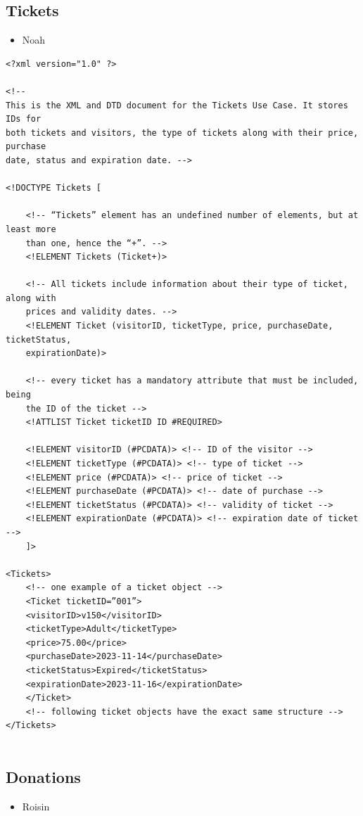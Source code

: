 \documentclass{article} %
\begin{document}
\subsection{Tickets}
\begin{itemize}
    \item Noah
\end{itemize}

\begin{verbatim}
<?xml version="1.0" ?>

<!-- 
This is the XML and DTD document for the Tickets Use Case. It stores IDs for 
both tickets and visitors, the type of tickets along with their price, purchase 
date, status and expiration date. -->

<!DOCTYPE Tickets [
    
    <!-- “Tickets” element has an undefined number of elements, but at least more  
    than one, hence the “+”. -->
    <!ELEMENT Tickets (Ticket+)>

    <!-- All tickets include information about their type of ticket, along with 
    prices and validity dates. --> 
    <!ELEMENT Ticket (visitorID, ticketType, price, purchaseDate, ticketStatus, 
    expirationDate)>

    <!-- every ticket has a mandatory attribute that must be included, being 
    the ID of the ticket -->
    <!ATTLIST Ticket ticketID ID #REQUIRED>

    <!ELEMENT visitorID (#PCDATA)> <!-- ID of the visitor -->
    <!ELEMENT ticketType (#PCDATA)> <!-- type of ticket -->
    <!ELEMENT price (#PCDATA)> <!-- price of ticket -->
    <!ELEMENT purchaseDate (#PCDATA)> <!-- date of purchase -->
    <!ELEMENT ticketStatus (#PCDATA)> <!-- validity of ticket -->
    <!ELEMENT expirationDate (#PCDATA)> <!-- expiration date of ticket -->
    ]>

<Tickets>
    <!-- one example of a ticket object -->
    <Ticket ticketID=”001”>
    <visitorID>v150</visitorID>
    <ticketType>Adult</ticketType>
    <price>75.00</price>
    <purchaseDate>2023-11-14</purchaseDate>
    <ticketStatus>Expired</ticketStatus>
    <expirationDate>2023-11-16</expirationDate>
    </Ticket>
    <!-- following ticket objects have the exact same structure -->
</Tickets>
    
\end{verbatim}

\subsection{Donations}
\begin{itemize}
    \item Roisin
\end{itemize}
\end{document}
